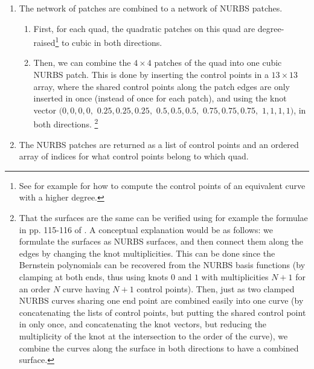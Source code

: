 \begin{enumerate}[resume]
\item The network of \Bez patches are combined to a network of NURBS patches.
\begin{enumerate} [label=(\alph*)]
\item First, for each quad, the quadratic \Bez patches on this quad are degree-raised\footnote{See for example \cite{bezDegRaise} for how to compute the control points of an equivalent \Bez curve with a higher degree.} to cubic in both directions.
%
\item Then, we can combine the $4\times4$ \Bez patches of the quad into one cubic NURBS patch. This is done by inserting the \Bez control points in a $13\times13$ array, where the shared control points along the \Bez patch edges are only inserted in once (instead of once for each \Bez patch), and using the knot vector 
$(0, 0, 0, 0,$ $0.25, 0.25, 0.25,$ $0.5, 0.5, 0.5,$ $0.75, 0.75, 0.75,$ $1, 1, 1, 1)$, in both directions.%
%
\footnote{That the surfaces are the same can be verified using for example the formulae in pp. 115-116 of \cite{shikin1995handbook}. A conceptual explanation would be as follows: we formulate the \Bez surfaces as NURBS surfaces, and then connect them along the edges by changing the knot multiplicities. This can be done since the Bernstein polynomials can be recovered from the NURBS basis functions (by clamping at both ends, thus using knots $0$ and $1$ with multiplicities $N+1$ for an order $N$ curve having $N+1$ control points). Then, just as two clamped NURBS curves sharing one end point are combined easily into one curve (by concatenating the lists of control points, but putting the shared control point in only once, and concatenating the knot vectors, but reducing the multiplicity of the knot at the intersection to the order of the curve), we combine the curves along the surface in both directions to have a combined surface.}
%
\end{enumerate}
\item The NURBS patches are returned as a list of control points and an ordered array of indices for what control points belong to which quad.
\end{enumerate}
